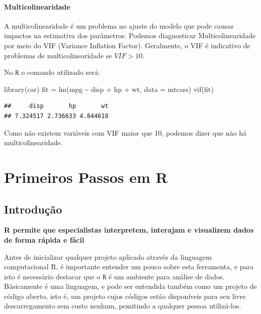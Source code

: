 \documentclass[
]{book}
\newenvironment{Shaded}{\begin{snugshade}}{\end{snugshade}}
\newcommand{\AttributeTok}[1]{\textcolor[rgb]{0.77,0.63,0.00}{#1}}
\newcommand{\FunctionTok}[1]{\textcolor[rgb]{0.00,0.00,0.00}{#1}}
\newcommand{\NormalTok}[1]{#1}
\newcommand{\OtherTok}[1]{\textcolor[rgb]{0.56,0.35,0.01}{#1}}
\newcommand{\SpecialCharTok}[1]{\textcolor[rgb]{0.00,0.00,0.00}{#1}}
\begin{document}
\hypertarget{multicolinearidade}{%
\subsubsection{\texorpdfstring{\textbf{Multicolinearidade}}{Multicolinearidade}}\label{multicolinearidade}}

A multicolinearidade é um problema no ajuste do modelo que pode causar impactos na estimativa dos parâmetros. Podemos diagnosticar Multicolinearidade por meio do VIF (Variance Inflation Factor). Geralmente, o VIF é indicativo de problemas de multicolinearidade se \(VIF>10\).

No \(\texttt{R}\) o comando utilizado será:

\begin{Shaded}
\begin{Highlighting}[]
\FunctionTok{library}\NormalTok{(car)}
\NormalTok{fit }\OtherTok{=} \FunctionTok{lm}\NormalTok{(mpg }\SpecialCharTok{\textasciitilde{}}\NormalTok{ disp }\SpecialCharTok{+}\NormalTok{ hp }\SpecialCharTok{+}\NormalTok{ wt, }\AttributeTok{data =}\NormalTok{ mtcars)}
\FunctionTok{vif}\NormalTok{(fit)}
\end{Highlighting}
\end{Shaded}

\begin{verbatim}
##     disp       hp       wt 
## 7.324517 2.736633 4.844618
\end{verbatim}

Como não existem variáveis com VIF maior que 10, podemos dizer que não há multicolinearidade.

\hypertarget{primeiros-passos-em-r}{%
\chapter{Primeiros Passos em R}\label{primeiros-passos-em-r}}

\hypertarget{introduuxe7uxe3o}{%
\section{Introdução}\label{introduuxe7uxe3o}}

\textbf{R permite que especialistas interpretem, interajam e visualizem dados de forma rápida e fácil}

Antes de inicializar qualquer projeto aplicado através da linguagem computacional R, é importante entender um pouco sobre esta ferramenta, e para isto é necessário destacar que o \(\texttt{R}\) é um ambiente para análise de dados. Básicamente é uma linguagem, e pode ser entendida também como um projeto de código aberto, isto é, um projeto cujos códigos estão disponíveis para seu livre descarregamento sem custo nenhum, pemitindo a qualquer pessoa utilizá-los.
\end{document}
